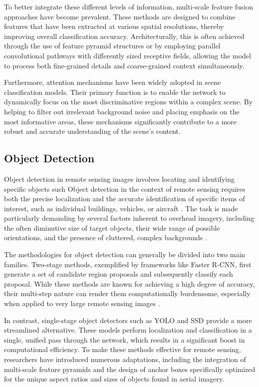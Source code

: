 \documentclass[12pt,a4paper]{article}
\begin{document}
To better integrate these different levels of information, multi-scale feature fusion approaches have become prevalent. These methods are designed to combine features that have been extracted at various spatial resolutions, thereby improving overall classification accuracy. Architecturally, this is often achieved through the use of feature pyramid structures or by employing parallel convolutional pathways with differently sized receptive fields, allowing the model to process both fine-grained details and coarse-grained context simultaneously.

Furthermore, attention mechanisms have been widely adopted in scene classification models. Their primary function is to enable the network to dynamically focus on the most discriminative regions within a complex scene. By helping to filter out irrelevant background noise and placing emphasis on the most informative areas, these mechanisms significantly contribute to a more robust and accurate understanding of the scene's content.

\subsection{Object Detection}
Object detection in remote sensing images involves locating and identifying specific objects such Object detection in the context of remote sensing requires both the precise localization and the accurate identification of specific items of interest, such as individual buildings, vehicles, or aircraft \cite{cheng2016survey}. The task is made particularly demanding by several factors inherent to overhead imagery, including the often diminutive size of target objects, their wide range of possible orientations, and the presence of cluttered, complex backgrounds \cite{zhang2016weakly}.

The methodologies for object detection can generally be divided into two main families. Two-stage methods, exemplified by frameworks like Faster R-CNN, first generate a set of candidate region proposals and subsequently classify each proposal. While these methods are known for achieving a high degree of accuracy, their multi-step nature can render them computationally burdensome, especially when applied to very large remote sensing images \cite{deng2017enhanced}.

In contrast, single-stage object detectors such as YOLO and SSD provide a more streamlined alternative. These models perform localization and classification in a single, unified pass through the network, which results in a significant boost in computational efficiency. To make these methods effective for remote sensing, researchers have introduced numerous adaptations, including the integration of multi-scale feature pyramids and the design of anchor boxes specifically optimized for the unique aspect ratios and sizes of objects found in aerial imagery.
\end{document}
